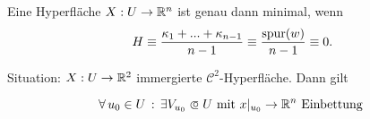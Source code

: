 \documentclass{cheat-sheet}
\begin{document}
\begin{satz}
  Eine Hyperfläche $X : U \to \mathbb{R}^n$ ist genau dann minimal, wenn
  \[ H \equiv \frac{\kappa_1 + ... + \kappa_{n{-}1}}{n-1} \equiv \frac{\mathrm{spur}(w)}{n-1} \equiv 0. \]
\end{satz}





Situation: $X : U \to \mathbb{R}^2$ immergierte $\mathcal{C}^2$-Hyperfläche. Dann gilt

\[ \fa{u_0 \in U} \exists V_{u_0} \opn U \text{ mit } x|_{u_0} \to \R^n \text{ Einbettung } \]
\end{document}
